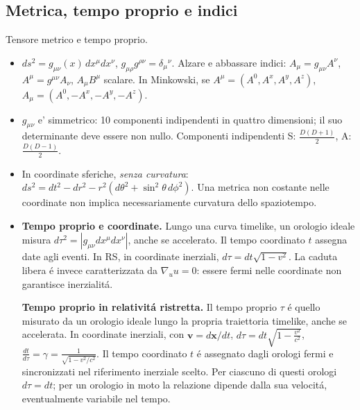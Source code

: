 \subsection{Metrica, tempo proprio e indici}

\begin{frame}[t]{Tensore metrico e tempo proprio.}\small\raggedright
    \begin{itemize}
        \item {\footnotesize $ds^2=g_{\mu\nu}(x)\,dx^\mu dx^\nu$, $g_{\mu\rho}g^{\rho\nu}=\delta_\mu{}^\nu$. Alzare e abbassare indici: $A_\mu=g_{\mu\nu}A^\nu$, $A^\mu=g^{\mu\nu}A_\nu$, $A_\mu B^\mu$ scalare. In Minkowski, se $A^\mu=(A^0,A^x,A^y,A^z)$, $A_\mu=(A^0,-A^x,-A^y,-A^z)$.\par}
        \item {\footnotesize $g_{\mu\nu}$ e' simmetrico: 10 componenti indipendenti in quattro dimensioni; il suo determinante deve essere non nullo. Componenti indipendenti S: $\frac{D(D+1)}{2}$, A: $\frac{D(D-1)}{2}$.\par}
\item In coordinate sferiche, \emph{senza curvatura}: $ds^2=dt^2-dr^2-r^2(d\theta^2+\sin^2\theta\,d\phi^2)$. Una metrica non costante nelle coordinate non implica necessariamente curvatura dello spaziotempo.
\item \textbf{Tempo proprio e coordinate.} Lungo una curva timelike, un orologio ideale misura $d\tau^2=|g_{\mu\nu}dx^\mu dx^\nu|$, anche se accelerato. Il tempo coordinato $t$ assegna date agli eventi. In RS, in coordinate inerziali, $d\tau=dt\sqrt{1-v^2}$. La caduta libera \'e invece caratterizzata da $\nabla_u u=0$: essere fermi nelle coordinate non garantisce inerzialit\'a.

    \textbf{Tempo proprio in relativit\'a ristretta.} Il tempo proprio $\tau$ \'e quello misurato da un orologio ideale lungo la propria traiettoria timelike, anche se accelerata. In coordinate inerziali, con $\mathbf v=d\mathbf x/dt$, $d\tau=dt\sqrt{1-\frac{v^2}{c^2}}$, $\frac{dt}{d\tau}=\gamma=\frac{1}{\sqrt{1-v^2/c^2}}$. Il tempo coordinato $t$ \'e assegnato dagli orologi fermi e sincronizzati nel riferimento inerziale scelto. Per ciascuno di questi orologi $d\tau=dt$; per un orologio in moto la relazione dipende dalla sua velocit\'a, eventualmente variabile nel tempo.


\end{itemize}
\end{frame}
